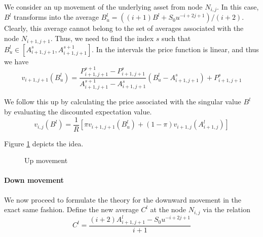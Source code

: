 We consider an up movement of the underlying asset from node $ N_{i,j} $. In this case, $ B^l $ transforms into the average $ B^l_u = \left( (i+1) B^l + S_0 u^{-i+2j+1} \right) / ( i+2 ) $. Clearly, this average cannot belong to the set of averages associated with the node $ N_{i+1,j+1} $. Thus, we need to find the index $s$ such that $ B^l_u \in \left[ A_{i+1,j+1}^{s} , A_{i+1,j+1}^{s+1} \right] $. In the intervals the price function is linear, and thus we have
\begin{equation}
	\label{eq:asian-up-lint}
	v_{i+1,j+1} \left( B^l_u \right) = \frac{ P_{i+1,j+1}^{s+1} - P_{i+1,j+1}^{s} }{ A_{i+1,j+1}^{s+1} - A_{i+1,j+1}^{s} } \left( B^l_u - A_{i+1,j+1}^{s} \right) + P_{i+1,j+1}^{s}
\end{equation}

We follow this up by calculating the price associated with the singular value $ B^l $ by evaluating the discounted expectation value.
\begin{equation}
	\label{eq:asian-up-pr}
	v_{i,j}( B^l ) = \frac{1}{R} \left[ \pi v_{i+1,j+1} \left( B^l_u \right) + (1 - \pi) v_{i+1,j} \left( A_{i+1,j}^l \right) \right]
\end{equation}

Figure \ref{fig:asian-2tr-up} depicts the idea.
\begin{figure}[h]
	
	\caption{Up movement}
	\label{fig:asian-2tr-up}
\end{figure}



\paragraph{Down movement}

We now proceed to formulate the theory for the downward movement in the exact same fashion. Define the new average $ C^l $ at the node $ N_{i,j} $ via the relation
\begin{equation}
	\label{eq:asian-proj-dn}
	C^l = \frac{ ( i+2) A_{i+1,j+1}^l - S_0 u^{-i+2j+1} }{ i+1 }
\end{equation}

